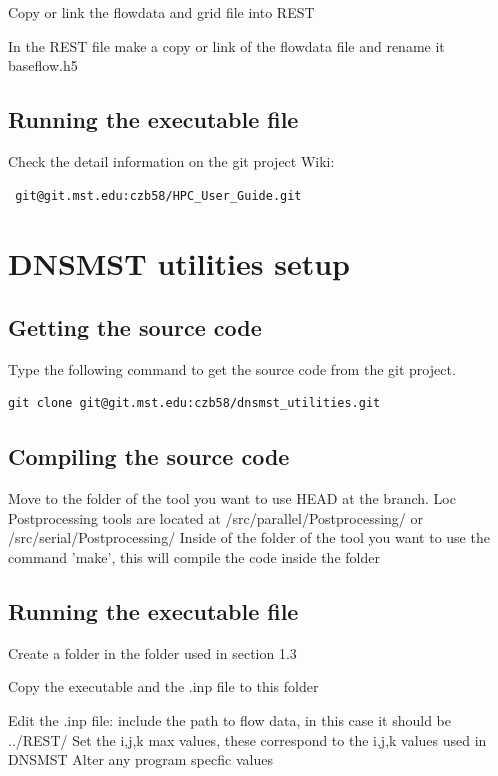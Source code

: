 \documentclass[12pt, oneside]{article}
\begin{document}
\noindent Copy or link the flowdata and grid file into REST

\noindent In the REST file make a copy or link of the flowdata file and rename it baseflow.h5




\subsection{Running the executable file}

Check the detail information on the git project Wiki: 
\begin{verbatim}
 git@git.mst.edu:czb58/HPC_User_Guide.git
\end{verbatim}






\section{DNSMST utilities setup}

\subsection{Getting the source code}

Type the following command to get the source code from the git project.

\begin{verbatim}
git clone git@git.mst.edu:czb58/dnsmst_utilities.git
\end{verbatim}

\subsection{Compiling the source code}
Move to the folder of the tool you want to use HEAD at the branch. Loc
Postprocessing tools are located at /src/parallel/Postprocessing/ or /src/serial/Postprocessing/
Inside of the folder of the tool you want to use the command 'make', this will compile the code inside the folder

\subsection{Running the executable file}
Create a folder in the folder used in section 1.3

Copy the executable and the .inp file to this folder

Edit the .inp file:
	include the path to flow data, in this case it should be ../REST/
	Set the i,j,k max values, these correspond to the i,j,k values used in DNSMST
	Alter any program specfic values
\end{document}
